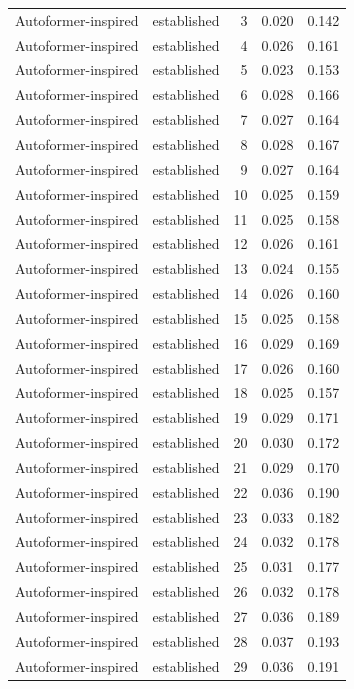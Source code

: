 \begin{tabular}{llrrr}
Autoformer-inspired & established & 3 & 0.020 & 0.142 \\
Autoformer-inspired & established & 4 & 0.026 & 0.161 \\
Autoformer-inspired & established & 5 & 0.023 & 0.153 \\
Autoformer-inspired & established & 6 & 0.028 & 0.166 \\
Autoformer-inspired & established & 7 & 0.027 & 0.164 \\
Autoformer-inspired & established & 8 & 0.028 & 0.167 \\
Autoformer-inspired & established & 9 & 0.027 & 0.164 \\
Autoformer-inspired & established & 10 & 0.025 & 0.159 \\
Autoformer-inspired & established & 11 & 0.025 & 0.158 \\
Autoformer-inspired & established & 12 & 0.026 & 0.161 \\
Autoformer-inspired & established & 13 & 0.024 & 0.155 \\
Autoformer-inspired & established & 14 & 0.026 & 0.160 \\
Autoformer-inspired & established & 15 & 0.025 & 0.158 \\
Autoformer-inspired & established & 16 & 0.029 & 0.169 \\
Autoformer-inspired & established & 17 & 0.026 & 0.160 \\
Autoformer-inspired & established & 18 & 0.025 & 0.157 \\
Autoformer-inspired & established & 19 & 0.029 & 0.171 \\
Autoformer-inspired & established & 20 & 0.030 & 0.172 \\
Autoformer-inspired & established & 21 & 0.029 & 0.170 \\
Autoformer-inspired & established & 22 & 0.036 & 0.190 \\
Autoformer-inspired & established & 23 & 0.033 & 0.182 \\
Autoformer-inspired & established & 24 & 0.032 & 0.178 \\
Autoformer-inspired & established & 25 & 0.031 & 0.177 \\
Autoformer-inspired & established & 26 & 0.032 & 0.178 \\
Autoformer-inspired & established & 27 & 0.036 & 0.189 \\
Autoformer-inspired & established & 28 & 0.037 & 0.193 \\
Autoformer-inspired & established & 29 & 0.036 & 0.191 \\

\end{tabular}
